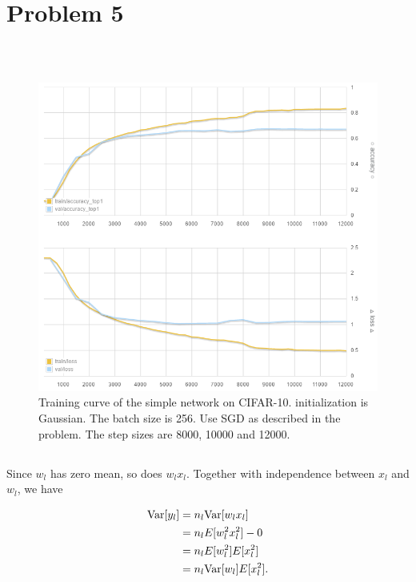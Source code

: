 \section{Problem 5}~\label{sec:prob5}

\subsection{} %

\begin{figure}[ht]
\centering
    \includegraphics[width=0.99\linewidth]{fig/curve1}
    \caption{\small
    Training curve of the simple network on CIFAR-10.
    initialization is Gaussian.
    The batch size is 256.
    Use SGD as described in the problem.
    The step sizes are 8000, 10000 and 12000.}
    \label{fig:1}
\end{figure}

\subsection{} %

Since $w_l$ has zero mean,
so does $w_l x_l$.
Together with independence between $x_l$ and $w_l$,
we have

\begin{equation}
\begin{split}
    {\mathop{\mathrm{Var}}}[y_l] &= n_l {\mathop{\mathrm{Var}}}[w_l x_l] \\
        &=n_l E[w_l^2 x_l^2] - 0 \\
        &=n_l E[w_l^2] E[x_l^2] \\
        &=n_l {\mathop{\mathrm{Var}}}[w_l] E[x_l^2].
\end{split}
\end{equation}


